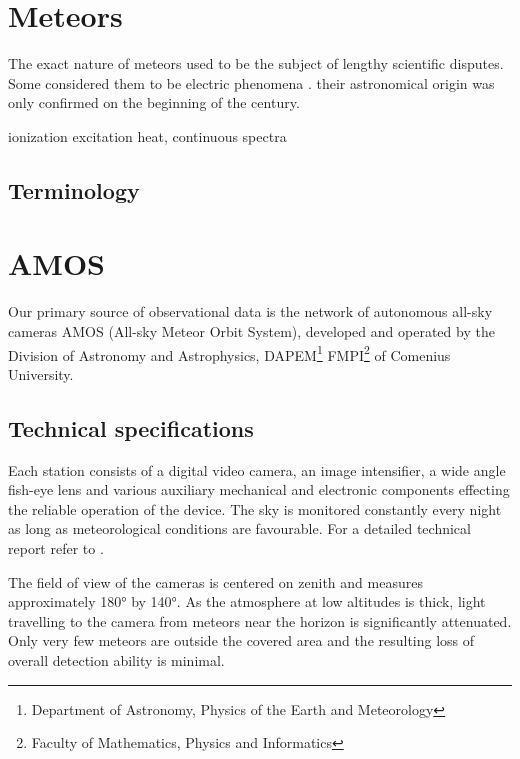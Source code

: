 \section{Meteors} \label{il}
    The exact nature of meteors used to be the subject of lengthy scientific disputes.
    Some considered them to be electric phenomena \citep{???}.
    their astronomical origin was only confirmed on the beginning of the  century.

    ionization
    excitation
    heat, continuous spectra


    \subsection{Terminology} \label{ilt}
        


\section{AMOS} \label{iA}
    Our primary source of observational data is the network of autonomous all-sky cameras AMOS (All-sky Meteor Orbit System),
    developed and operated by the Division of Astronomy and Astrophysics,
    DAPEM\footnote{Department of Astronomy, Physics of the Earth and Meteorology}
    FMPI\footnote{Faculty of Mathematics, Physics and Informatics} of Comenius University.

    \subsection{Technical specifications} \label{iAt}
        Each station consists of a digital video camera, an image intensifier, a wide angle fish-eye lens
        and various auxiliary mechanical and electronic components effecting
        the reliable operation of the device. The sky is monitored constantly every night
        as long as meteorological conditions are favourable. For a detailed technical report refer to \citet{zigo+2013,toth+2015}.

        The field of view of the cameras is centered on zenith and measures approximately \ang{180} by \ang{140}.
        As the atmosphere at low altitudes is thick, light travelling to the camera from
        meteors near the horizon is significantly attenuated.
        Only very few meteors are outside the covered area and the resulting loss of overall detection ability is minimal.


